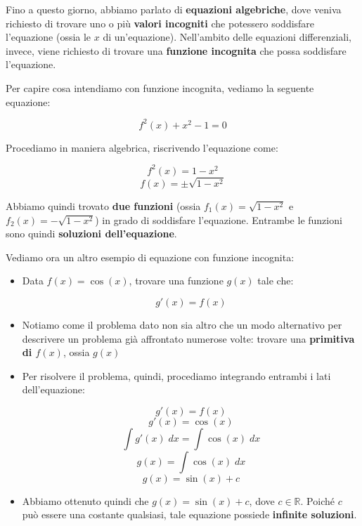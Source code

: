 \documentclass[a4paper, 12pt]{report}
\begin{document}
        Fino a questo giorno, abbiamo parlato di \textbf{equazioni algebriche}, dove veniva richiesto di trovare uno o più \textbf{valori incogniti} che potessero soddisfare l'equazione (ossia le $x$ di un'equazione). Nell'ambito delle equazioni differenziali, invece, viene richiesto di trovare una \textbf{funzione incognita} che possa soddisfare l'equazione.
        
        Per capire cosa intendiamo con funzione incognita, vediamo la seguente equazione:
        
        \[ f^2(x)+x^2-1 = 0\]
        
        Procediamo in maniera algebrica, riscrivendo l'equazione come:
        
        \[ f^2(x) = 1-x^2\]
        \[ f(x) = \pm \sqrt{1-x^2}\]
        
        Abbiamo quindi trovato \textbf{due funzioni} (ossia $f_1(x) = \sqrt{1-x^2}$ e $f_2(x) = -\sqrt{1-x^2}$) in grado di soddisfare l'equazione. Entrambe le funzioni sono quindi \textbf{soluzioni dell'equazione}.
        
        \quad
        
        Vediamo ora un altro esempio di equazione con funzione incognita:
        
        \begin{itemize}
            \item Data $f(x) = \cos(x)$, trovare una funzione $g(x)$ tale che:
            
            \[ g'(x) = f(x)\]
            
            \item Notiamo come il problema dato non sia altro che un modo alternativo per descrivere un problema già affrontato numerose volte: trovare una \textbf{primitiva di $f(x)$}, ossia $g(x)$
            
            \item Per risolvere il problema, quindi, procediamo integrando entrambi i lati dell'equazione:
            
            \[ g'(x) = f(x)\]
            \[ g'(x) = \cos(x)\]
            \[ \int g'(x) \; dx = \int \cos(x) \; dx\]
            \[ g(x) = \int \cos(x) \; dx\]
            \[ g(x) = \sin(x)+c\]
            
            \item Abbiamo ottenuto quindi che $g(x) = \sin(x)+c$, dove $c \in \mathbb{R}$. Poiché $c$ può essere una costante qualsiasi, tale equazione possiede \textbf{infinite soluzioni}.
            
        \end{itemize}
        
\end{document}
